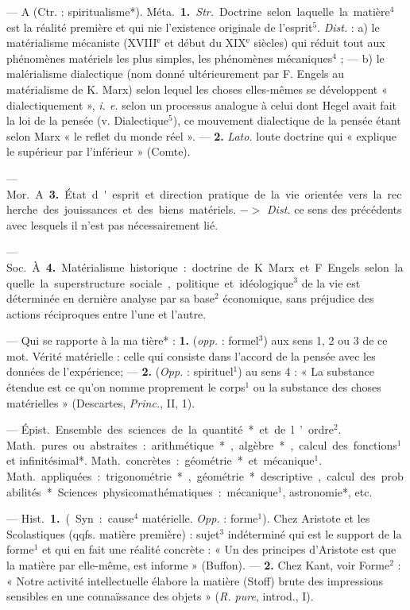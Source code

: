 \begin{itemize}[leftmargin=1cm, label=, itemsep=1pt]
 — A (Ctr. : spiritualisme*). \si{Méta.} {\bf 1.} {\it Str.} Doctrine
selon laquelle la matière$^4$ est la
réalité première et qui nie l'existence originale de l'esprit$^5$. {\it Dist.} :
a) le matérialisme mécaniste ({\footnotesize XVIII}$^\text{e}$
et début du {\footnotesize XIX}$^\text{e}$ siècles) qui réduit
tout aux phénomènes matériels les
plus simples, les phénomènes mécaniques$^4$ ; — b) le malérialisme dialectique (nom donné ultérieurement
par F. Engels au matérialisme de
K. Marx) selon lequel les choses
elles-mêmes se développent « dialectiquement », {\it i. e.} selon un processus analogue à celui dont Hegel
avait fait la loi de la pensée (v. Dialectique$^5$), ce mouvement dialectique
de la pensée étant selon Marx
« le reflet du monde réel ». — {\bf 2.} {\it Lato.}
loute doctrine qui « explique le
supérieur par l’inférieur » (Comte).

— \si{Mor.} A. {\bf 3.} État d'esprit et
direction pratique de la vie orientée
vers la recherche des jouissances et
des biens matériels. $->$ {\it Dist.} ce
sens des précédents avec lesquels
il n’est pas nécessairement lié.

— \si{Soc.} À. {\bf 4.} Matérialisme historique : doctrine de K. Marx et
F. Engels selon laquelle la superstructure sociale, politique et idéologique$^3$ de la vie est déterminée en
dernière analyse par sa base$^2$ économique, sans préjudice des actions
réciproques entre l’une et l’autre.

 — Qui se rapporte à la ma
tière* : {\bf 1.} ({\it opp.} : formel$^3$) aux sens 1,
2 ou 3 de ce mot. Vérité matérielle :
celle qui consiste dans l’accord de
la pensée avec les données de l’expérience; — {\bf 2.} ({\it Opp.} : spirituel$^1$) au
sens 4 : « La substance étendue est
ce qu’on nomme proprement le
corps$^1$ ou la substance des choses
matérielles » (Descartes, {\it Princ.},
II, 1).

 — \si{Épist.} Ensemble
des sciences de la quantité* et de
l’ordre$^2$. \si{Math.} pures ou abstraites :
arithmétique*, algèbre*, calcul des
fonctions$^1$ et infinitésimal*. \si{Math.}
concrètes : géométrie* et mécanique$^1$.
\si{Math.} appliquées : trigonométrie*,
géométrie* descriptive, calcul des
probabilités*. Sciences physicomathématiques : mécanique$^1$, astronomie*, etc.

 — \si{Hist.} {\bf 1.} (Syn. : cause$^4$ matérielle. {\it Opp.} : forme$^1$). Chez Aristote
et les Scolastiques (qqfs. matière première) : sujet$^3$ indéterminé qui est le
support de la forme$^1$ et qui en fait
une réalité concrète : « Un des principes d’Aristote est que la matière par elle-même, est informe » (Buffon). — {\bf 2.} Chez Kant, voir Forme$^2$ :
« Notre activité intellectuelle élabore
la matière (Stoff) brute des impressions sensibles en une connaïssance
des objets » ({\it R. pure}, introd., I).


\end{itemize}
